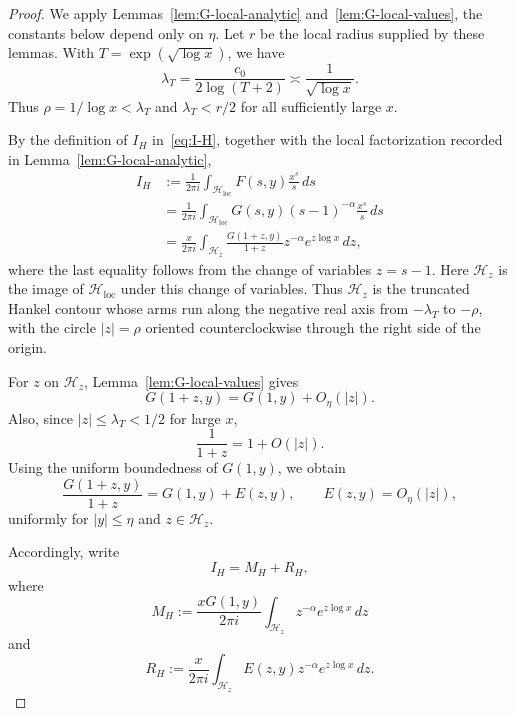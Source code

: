 \begin{proof}
We apply
Lemmas~\ref{lem:G-local-analytic} and~\ref{lem:G-local-values},
the constants below depend only on $\eta$. Let $r$ be the local
radius supplied by these lemmas. With
$T=\exp(\sqrt{\log x})$, we have
\[
    \lambda_T=\frac{c_0}{2\log(T+2)}
    \asymp \frac1{\sqrt{\log x}}.
\]
Thus $\rho=1/\log x<\lambda_T$ and $\lambda_T<r/2$ for all sufficiently
large $x$.

By the definition of $I_H$ in~\eqref{eq:I-H}, together with the
local factorization recorded in Lemma~\ref{lem:G-local-analytic},
\[
\begin{aligned}
    I_H
    &:=
    \frac{1}{2\pi i}
    \int_{\mathcal H_{\mathrm{loc}}}
    F(s,y)\frac{x^s}{s}\,ds                                      \\
    &=
    \frac{1}{2\pi i}
    \int_{\mathcal H_{\mathrm{loc}}}
    G(s,y)(s-1)^{-\alpha}\frac{x^s}{s}\,ds                         \\
    &=
    \frac{x}{2\pi i}
    \int_{\mathcal H_z}
    \frac{G(1+z,y)}{1+z}
    z^{-\alpha}e^{z\log x}\,dz,
\end{aligned}
\]
where the last equality follows from the change of variables
$z=s-1$. Here $\mathcal H_z$ is the image of
$\mathcal H_{\mathrm{loc}}$ under this change of variables.
Thus $\mathcal H_z$ is the truncated Hankel contour whose arms run
along the negative real axis from $-\lambda_T$ to $-\rho$, with the
circle $|z|=\rho$ oriented counterclockwise through the right side
of the origin.

For $z$ on $\mathcal H_z$, Lemma~\ref{lem:G-local-values} gives
\[
    G(1+z,y)=G(1,y)+O_\eta(|z|).
\]
Also, since $|z|\leq\lambda_T<1/2$ for large $x$,
\[
    \frac1{1+z}=1+O(|z|).
\]
Using the uniform boundedness of $G(1,y)$, we obtain
\begin{equation}\label{eq:hankel-local-error-factor}
    \frac{G(1+z,y)}{1+z}
    =G(1,y)+E(z,y),
    \qquad E(z,y)=O_\eta(|z|),
\end{equation}
uniformly for $|y|\leq\eta$ and $z\in\mathcal H_z$.

Accordingly, write
\[
    I_H=M_H+R_H,
\]
where
\[
    M_H
    :=
    \frac{xG(1,y)}{2\pi i}
    \int_{\mathcal H_z}z^{-\alpha}e^{z\log x}\,dz
\]
and
\[
    R_H
    :=
    \frac{x}{2\pi i}
    \int_{\mathcal H_z}E(z,y)z^{-\alpha}e^{z\log x}\,dz.
\]


\end{proof}

